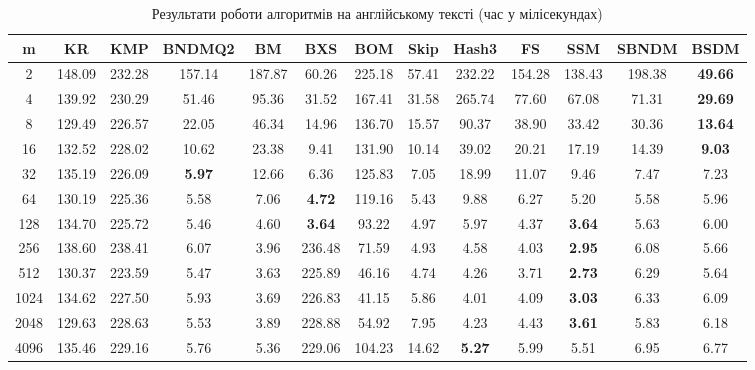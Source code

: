 \documentclass[a4paper,14pt]{extarticle} %
\begin{document}
	\begin{table}[H]
		\centering
		\scriptsize
		\begin{tabular}{|c|c|c|c|c|c|c|c|c|c|c|c|c|}
		\hline
		\textbf{m} & \textbf{KR} & \textbf{KMP} & \textbf{BNDMQ2} & \textbf{BM} & \textbf{BXS} & \textbf{BOM} & \textbf{Skip} & \textbf{Hash3} & \textbf{FS} & \textbf{SSM} & \textbf{SBNDM} & \textbf{BSDM} \\
		\hline
		2 & 148.09 & 232.28 & 157.14 & 187.87 & 60.26 & 225.18 & 57.41 & 232.22 & 154.28 & 138.43 & 198.38 & \textbf{49.66} \\
		\hline
		4 & 139.92 & 230.29 & 51.46 & 95.36 & 31.52 & 167.41 & 31.58 & 265.74 & 77.60 & 67.08 & 71.31 & \textbf{29.69} \\
		\hline
		8 & 129.49 & 226.57 & 22.05 & 46.34 & 14.96 & 136.70 & 15.57 & 90.37 & 38.90 & 33.42 & 30.36 & \textbf{13.64} \\
		\hline
		16 & 132.52 & 228.02 & 10.62 & 23.38 & 9.41 & 131.90 & 10.14 & 39.02 & 20.21 & 17.19 & 14.39 & \textbf{9.03} \\
		\hline
		32 & 135.19 & 226.09 & \textbf{5.97} & 12.66 & 6.36 & 125.83 & 7.05 & 18.99 & 11.07 & 9.46 & 7.47 & 7.23 \\
		\hline
		64 & 130.19 & 225.36 & 5.58 & 7.06 & \textbf{4.72} & 119.16 & 5.43 & 9.88 & 6.27 & 5.20 & 5.58 & 5.96 \\
		\hline
		128 & 134.70 & 225.72 & 5.46 & 4.60 & \textbf{3.64} & 93.22 & 4.97 & 5.97 & 4.37 & \textbf{3.64} & 5.63 & 6.00 \\
		\hline
		256 & 138.60 & 238.41 & 6.07 & 3.96 & 236.48 & 71.59 & 4.93 & 4.58 & 4.03 & \textbf{2.95} & 6.08 & 5.66 \\
		\hline
		512 & 130.37 & 223.59 & 5.47 & 3.63 & 225.89 & 46.16 & 4.74 & 4.26 & 3.71 & \textbf{2.73} & 6.29 & 5.64 \\
		\hline
		1024 & 134.62 & 227.50 & 5.93 & 3.69 & 226.83 & 41.15 & 5.86 & 4.01 & 4.09 & \textbf{3.03} & 6.33 & 6.09 \\
		\hline
		2048 & 129.63 & 228.63 & 5.53 & 3.89 & 228.88 & 54.92 & 7.95 & 4.23 & 4.43 & \textbf{3.61} & 5.83 & 6.18 \\
		\hline
		4096 & 135.46 & 229.16 & 5.76 & 5.36 & 229.06 & 104.23 & 14.62 & \textbf{5.27} & 5.99 & 5.51 & 6.95 & 6.77 \\
		\hline
		\end{tabular}
		\caption{Результати роботи алгоритмів на англійському тексті (час у мілісекундах)}
		\label{table:lotr}
		\end{table}
\end{document}
